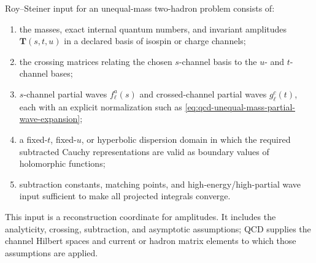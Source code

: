 \begin{definition}
\label{def:qcd-roy-steiner-input}
Roy--Steiner input for an unequal-mass two-hadron problem consists of:
\begin{enumerate}
  \item the masses, exact internal quantum numbers, and invariant amplitudes
  \(\mathbf T(s,t,u)\) in a declared basis of isospin or charge channels;
  \item the crossing matrices relating the chosen \(s\)-channel basis to the
  \(u\)- and \(t\)-channel bases;
  \item \(s\)-channel partial waves \(f_\ell^a(s)\) and crossed-channel
  partial waves \(g_\ell^c(t)\), each with an explicit normalization such as
  \eqref{eq:qcd-unequal-mass-partial-wave-expansion};
  \item a fixed-\(t\), fixed-\(u\), or hyperbolic dispersion domain in which
  the required subtracted Cauchy representations are valid as boundary values
  of holomorphic functions;
  \item subtraction constants, matching points, and high-energy/high-partial
  wave input sufficient to make all projected integrals converge.
\end{enumerate}
This input is a reconstruction coordinate for amplitudes.  It includes the
analyticity, crossing, subtraction, and asymptotic assumptions; QCD supplies
the channel Hilbert spaces and current or hadron matrix elements to which
those assumptions are applied.
\end{definition}

